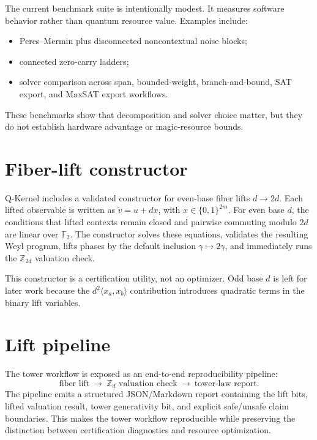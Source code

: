 \documentclass[11pt]{article}
\begin{document}
The current benchmark suite is intentionally modest.  It measures software behavior rather than quantum resource value.  Examples include:
\begin{itemize}[leftmargin=*]
  \item Peres--Mermin plus disconnected noncontextual noise blocks;
  \item connected zero-carry ladders;
  \item solver comparison across span, bounded-weight, branch-and-bound, SAT export, and MaxSAT export workflows.
\end{itemize}
These benchmarks show that decomposition and solver choice matter, but they do not establish hardware advantage or magic-resource bounds.




\section{Fiber-lift constructor}

Q-Kernel includes a validated constructor for even-base fiber lifts \(d\to 2d\).  Each lifted observable is written as \(\tilde v=u+d x\), with \(x\in\{0,1\}^{2m}\).  For even base \(d\), the conditions that lifted contexts remain closed and pairwise commuting modulo \(2d\) are linear over \(\mathbb{F}_2\).  The constructor solves these equations, validates the resulting Weyl program, lifts phases by the default inclusion \(\gamma\mapsto 2\gamma\), and immediately runs the \(\mathbb{Z}_{2d}\) valuation check.

This constructor is a certification utility, not an optimizer.  Odd base \(d\) is left for later work because the \(d^2\langle x_a,x_b\rangle\) contribution introduces quadratic terms in the binary lift variables.



\section{Lift pipeline}

The tower workflow is exposed as an end-to-end reproducibility pipeline:
\[
  \text{fiber lift}\ \longrightarrow\ \mathbb{Z}_d\text{ valuation check}\ \longrightarrow\ \text{tower-law report}.
\]
The pipeline emits a structured JSON/Markdown report containing the lift bits, lifted valuation result, tower generativity bit, and explicit safe/unsafe claim boundaries.  This makes the tower workflow reproducible while preserving the distinction between certification diagnostics and resource optimization.
\end{document}
